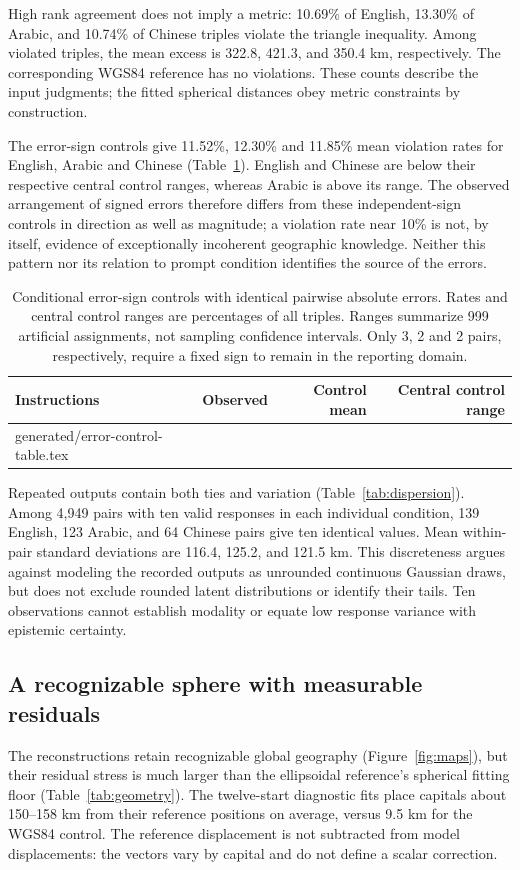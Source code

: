 \documentclass[12pt,a4paper]{article}
\makeatletter
\newcommand{\tableinput}[1]{\@@input #1 }
\makeatother
\begin{document}
High rank agreement does not imply a metric: 10.69\% of English, 13.30\% of Arabic, and 10.74\% of Chinese triples violate the triangle inequality. Among violated triples, the mean excess is 322.8, 421.3, and 350.4 km, respectively. The corresponding WGS84 reference has no violations. These counts describe the input judgments; the fitted spherical distances obey metric constraints by construction.

The error-sign controls give 11.52\%, 12.30\% and 11.85\% mean violation rates for English, Arabic and Chinese (Table~\ref{tab:errorcontrol}). English and Chinese are below their respective central control ranges, whereas Arabic is above its range. The observed arrangement of signed errors therefore differs from these independent-sign controls in direction as well as magnitude; a violation rate near 10\% is not, by itself, evidence of exceptionally incoherent geographic knowledge. Neither this pattern nor its relation to prompt condition identifies the source of the errors.

\begin{table}[htbp]\centering\small
\caption{Conditional error-sign controls with identical pairwise absolute errors. Rates and central control ranges are percentages of all triples. Ranges summarize 999 artificial assignments, not sampling confidence intervals. Only 3, 2 and 2 pairs, respectively, require a fixed sign to remain in the reporting domain.}\label{tab:errorcontrol}
\begin{tabular}{lrrr}\toprule Instructions & Observed & Control mean & Central control range \\\midrule
\tableinput{generated/error-control-table.tex}
\bottomrule\end{tabular}
\end{table}


Repeated outputs contain both ties and variation (Table~\ref{tab:dispersion}). Among 4,949 pairs with ten valid responses in each individual condition, 139 English, 123 Arabic, and 64 Chinese pairs give ten identical values. Mean within-pair standard deviations are 116.4, 125.2, and 121.5 km. This discreteness argues against modeling the recorded outputs as unrounded continuous Gaussian draws, but does not exclude rounded latent distributions or identify their tails. Ten observations cannot establish modality or equate low response variance with epistemic certainty.



\subsection{A recognizable sphere with measurable residuals}
The reconstructions retain recognizable global geography (Figure~\ref{fig:maps}), but their residual stress is much larger than the ellipsoidal reference's spherical fitting floor (Table~\ref{tab:geometry}). The twelve-start diagnostic fits place capitals about 150--158 km from their reference positions on average, versus 9.5 km for the WGS84 control. The reference displacement is not subtracted from model displacements: the vectors vary by capital and do not define a scalar correction.
\end{document}
